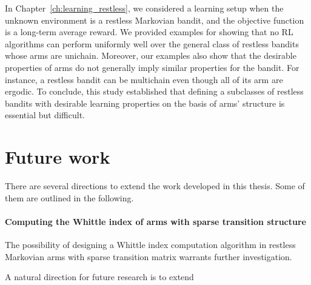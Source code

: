 In Chapter~\ref{ch:learning_restless}, we considered a learning setup when the unknown environment is a restless Markovian bandit, and the objective function is a long-term average reward. 
We provided examples for showing that no RL algorithms can perform uniformly well over the general class of restless bandits whose arms are unichain.
Moreover, our examples also show that the desirable properties of arms do not generally imply similar properties for the bandit.
For instance, a restless bandit can be multichain even though all of its arm are ergodic.
To conclude, this study established that defining a subclasses of restless bandits with desirable learning properties on the basis of arms' structure is essential but difficult. 

\section{Future work}

There are several directions to extend the work developed in this thesis. Some of them are outlined in the following.

\paragraph{Computing the Whittle index of arms with sparse transition structure}
The possibility of designing a Whittle index computation algorithm in restless Markovian arms with sparse transition matrix warrants further investigation.

A natural direction for future research is to extend 

\endgroup
